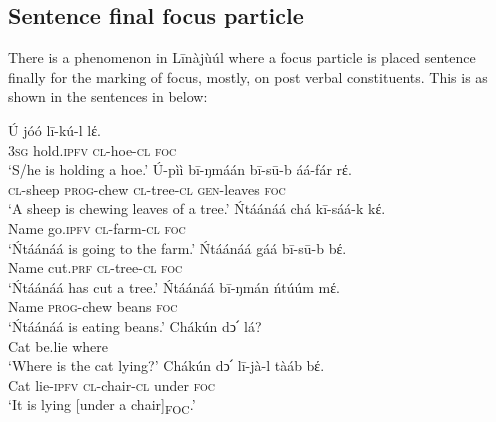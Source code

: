 \documentclass[output=paper,colorlinks,citecolor=brown]{langscibook}
\begin{document}
\subsection{Sentence final focus particle}\label{sec:bisilki:5.3}

There is a phenomenon in Līnàjùúl where a focus particle is placed sentence finally for the marking of focus, mostly, on post verbal constituents. This is as shown in the sentences in  below:

\ea%
    \label{ex:bisilki:17}
    \ea\label{ex:bisilki:17a}
    \gll    Ú	jóó		lī-kú-l		lέ.\\
            \textsc{3sg}	hold\textsc{.ipfv}	\textsc{cl-}hoe\textsc{-cl}	\textsc{foc}\\
    \glt    ‘S/he is holding a hoe.’
    \ex\label{ex:bisilki:17b}
    \gll    Ú-pìì	bī-ŋmáán	bī-sū-b		áá-fár		rέ.\\
            \textsc{cl-}sheep	\textsc{prog-}chew	\textsc{cl-}tree\textsc{-cl}	\textsc{gen-}leaves	\textsc{foc}\\
    \glt    ‘A sheep is chewing leaves of a tree.’
    \ex\label{ex:bisilki:17c}
    \gll    Ńtáánáá	chá		kī-sáá-k		kέ.\\
            Name		go\textsc{.ipfv}	\textsc{cl-}farm\textsc{-cl}		\textsc{foc}\\
    \glt    ‘Ńtáánáá is going to the farm.’
    \ex\label{ex:bisilki:17d}
    \gll    Ńtáánáá	gáá		bī-sū-b	bέ.\\
            Name		cut\textsc{.prf}	\textsc{cl-}tree\textsc{-cl}	\textsc{foc}\\
    \glt    ‘Ńtáánáá has cut a tree.’
    \ex\label{ex:bisilki:17e}
    \gll    Ńtáánáá	bī-ŋmán	ńtúúm			mέ.\\
            Name		\textsc{prog-}chew	beans			\textsc{foc}\\
    \glt    ‘Ńtáánáá is eating beans.’
    \ex\label{ex:bisilki:17f}
        \ea\label{ex:bisilki:17fi}
        \gll    Chákún	dↄ՛		lá?\\
                Cat		be.lie		where\\
        \glt    ‘Where is the cat lying?’
        \ex\label{ex:bisilki:17fii}
        \gll    Chákún	dↄ՛		lī-jà-l		tàáb	bέ.\\
            Cat		lie\textsc{-ipfv}	\textsc{cl-}chair\textsc{-cl}	under	\textsc{foc}\\
        \glt    ‘It is lying [under a chair]\textsubscript{FOC}.’
        \z
    \z
\z
\end{document}
